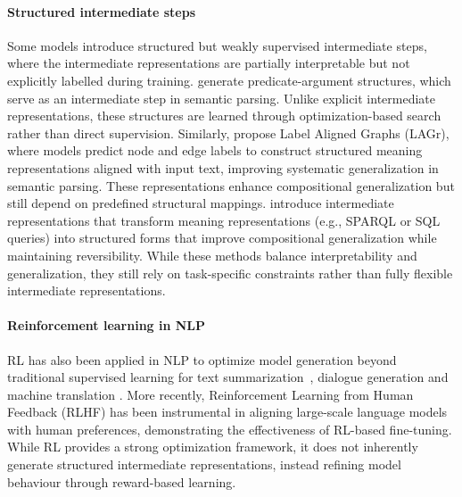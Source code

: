 \paragraph{Structured intermediate steps}
Some models introduce structured but weakly supervised intermediate steps, where the intermediate representations are partially interpretable but not explicitly labelled during training. \citeauthor{cheng-etal-2017-learning} \citeyearpar{cheng-etal-2017-learning} generate predicate-argument structures, which serve as an intermediate step in semantic parsing. Unlike explicit intermediate representations, these structures are learned through optimization-based search rather than direct supervision.
Similarly, \citeauthor{jambor-bahdanau-2022-lagr} \citeyearpar{jambor-bahdanau-2022-lagr} propose Label Aligned Graphs (LAGr), where models predict node and edge labels to construct structured meaning representations aligned with input text, improving systematic generalization in semantic parsing. These representations enhance compositional generalization but still depend on predefined structural mappings.
\citeauthor{herzig2021unlockingcompositionalgeneralizationpretrained} \citeyearpar{herzig2021unlockingcompositionalgeneralizationpretrained} introduce intermediate representations that transform meaning representations (e.g., SPARQL or SQL queries) into structured forms that improve compositional generalization while maintaining reversibility. 
While these methods balance interpretability and generalization, they still rely on task-specific constraints rather than fully flexible intermediate representations.

\paragraph{Reinforcement learning in NLP}
RL has also been applied in NLP to optimize model generation beyond traditional supervised learning for text summarization~\citep{paulus2018a}, dialogue generation \cite{li-etal-2016-deep} and machine translation \cite{wu-etal-2018-study}. More recently, Reinforcement Learning from Human Feedback (RLHF) \cite{NIPS2017_d5e2c0ad} has been instrumental in aligning large-scale language models with human preferences, demonstrating the effectiveness of RL-based fine-tuning. While RL provides a strong optimization framework, it does not inherently generate structured intermediate representations, instead refining model behaviour through reward-based learning.



